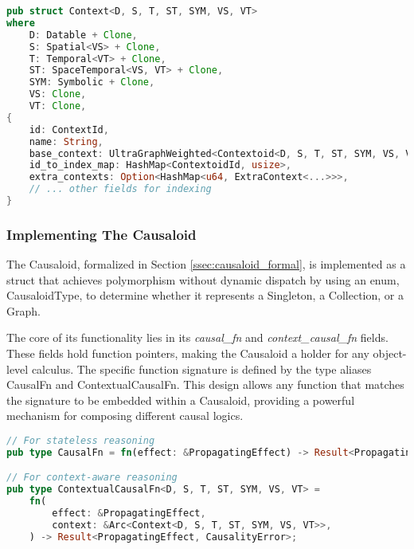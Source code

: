 \begin{lstlisting}[language=Rust, label={list:ContextStruct}, caption={The DeepCausality Context Struct}]
pub struct Context<D, S, T, ST, SYM, VS, VT>
where
    D: Datable + Clone,
    S: Spatial<VS> + Clone,
    T: Temporal<VT> + Clone,
    ST: SpaceTemporal<VS, VT> + Clone,
    SYM: Symbolic + Clone,
    VS: Clone,
    VT: Clone,
{
    id: ContextId,
    name: String,
    base_context: UltraGraphWeighted<Contextoid<D, S, T, ST, SYM, VS, VT>, u64>,
    id_to_index_map: HashMap<ContextoidId, usize>,
    extra_contexts: Option<HashMap<u64, ExtraContext<...>>>,
    // ... other fields for indexing
}
\end{lstlisting}

\newpage

\subsubsection{Implementing The Causaloid}

The Causaloid, formalized in Section \ref{ssec:causaloid_formal}, is implemented as a struct that achieves polymorphism without dynamic dispatch by using an enum, CausaloidType, to determine whether it represents a Singleton, a Collection, or a Graph.

The core of its functionality lies in its \textit{causal\_fn} and \textit{context\_causal\_fn} fields. These fields hold function pointers, making the Causaloid a holder for any object-level calculus. The specific function signature is defined by the type aliases CausalFn and ContextualCausalFn. This design allows any function that matches the signature to be embedded within a Causaloid, providing a powerful mechanism for composing different causal logics.

\begin{lstlisting}[language=Rust, label={list:CausalFn}, caption={The Causal Function Type Alias}]
// For stateless reasoning
pub type CausalFn = fn(effect: &PropagatingEffect) -> Result<PropagatingEffect, CausalityError>;

// For context-aware reasoning
pub type ContextualCausalFn<D, S, T, ST, SYM, VS, VT> =
    fn(
        effect: &PropagatingEffect,
        context: &Arc<Context<D, S, T, ST, SYM, VS, VT>>,
    ) -> Result<PropagatingEffect, CausalityError>;
\end{lstlisting}


